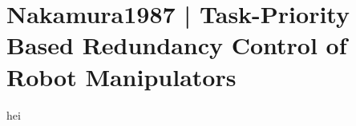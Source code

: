 \section{Nakamura1987 | Task-Priority Based Redundancy
Control of Robot Manipulators}

\cite{nakamura1987} 

hei
